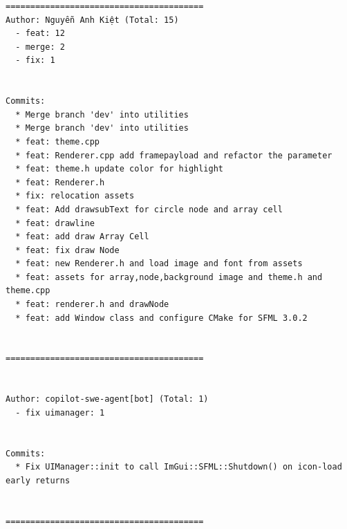\begin{small}
\begin{verbatim}
========================================
Author: Nguyễn Anh Kiệt (Total: 15)
  - feat: 12
  - merge: 2
  - fix: 1


Commits:
  * Merge branch 'dev' into utilities
  * Merge branch 'dev' into utilities
  * feat: theme.cpp
  * feat: Renderer.cpp add framepayload and refactor the parameter
  * feat: theme.h update color for highlight
  * feat: Renderer.h
  * fix: relocation assets
  * feat: Add drawsubText for circle node and array cell
  * feat: drawline
  * feat: add draw Array Cell
  * feat: fix draw Node
  * feat: new Renderer.h and load image and font from assets
  * feat: assets for array,node,background image and theme.h and theme.cpp
  * feat: renderer.h and drawNode
  * feat: add Window class and configure CMake for SFML 3.0.2


========================================


Author: copilot-swe-agent[bot] (Total: 1)
  - fix uimanager: 1


Commits:
  * Fix UIManager::init to call ImGui::SFML::Shutdown() on icon-load early returns


========================================
\end{verbatim}
\end{small}

